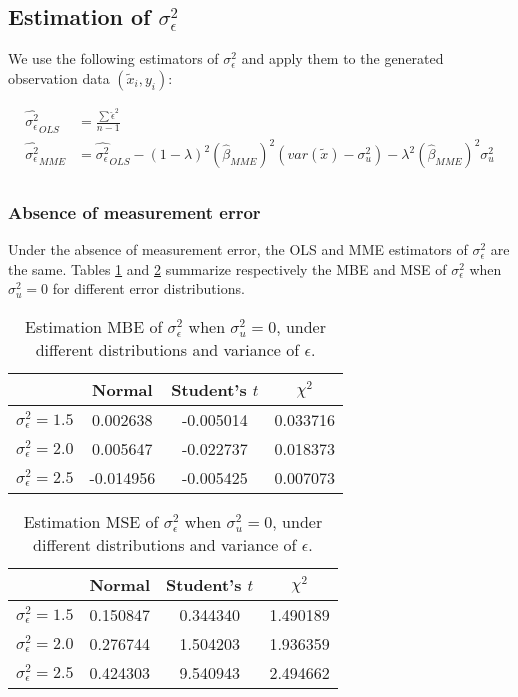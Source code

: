 \documentclass{article}
\begin{document}
\subsection{Estimation of $\sigma^2_\epsilon$}

We use the following estimators of $\sigma^2_\epsilon$ and apply them to the generated observation data $(\tilde{x}_i, y_i)$:

\begin{equation}
    \begin{split}
        \hat{\sigma^2_\epsilon}_{OLS} &= \frac{\sum \hat{\epsilon}^2}{n-1}\\
        \hat{\sigma_\epsilon^2}_{MME} &= \hat{\sigma^2_\epsilon}_{OLS} -  (1-\lambda)^2 (\hat{\beta}_{MME})^2 (var(\tilde{x}) - \sigma^2_u) - \lambda^2 (\hat{\beta}_{MME})^2 \sigma_u^2\\
    \end{split}
\end{equation}

\subsubsection{Absence of measurement error}

Under the absence of measurement error, the OLS and MME estimators of $\sigma^2_\epsilon$ are the same. 
Tables \ref{Tab:MBE_sigma_absence} and \ref{Tab:MSE_sigma_absence} summarize respectively the MBE and MSE of $\sigma^2_\epsilon$ when $\sigma^2_u=0$ for different error distributions.

\begin{table}[ht]
    \centering
    \caption{Estimation MBE of $\sigma^2_\epsilon$ when $\sigma^2_u=0$, under different distributions and variance of $\epsilon$.}
    \label{Tab:MBE_sigma_absence}
    \begin{tabular}[t]{lccc}
        \hline
        &Normal&Student's $t$&$\chi^2$\\
        \hline
        $\sigma^2_\epsilon = 1.5$&0.002638&-0.005014&0.033716\\
        $\sigma^2_\epsilon = 2.0$&0.005647&-0.022737&0.018373\\
        $\sigma^2_\epsilon = 2.5$&-0.014956&-0.005425&0.007073\\
        \hline
    \end{tabular}
\end{table}

\begin{table}[ht]
    \centering
    \caption{Estimation MSE of $\sigma^2_\epsilon$ when $\sigma^2_u=0$, under different distributions and variance of $\epsilon$.}
    \label{Tab:MSE_sigma_absence}
    \begin{tabular}[t]{lccc}
        \hline
        &Normal&Student's $t$&$\chi^2$\\
        \hline
        $\sigma^2_\epsilon = 1.5$&0.150847&0.344340&1.490189\\
        $\sigma^2_\epsilon = 2.0$&0.276744&1.504203&1.936359\\
        $\sigma^2_\epsilon = 2.5$&0.424303&9.540943&2.494662\\
        \hline
    \end{tabular}
\end{table}
\end{document}
